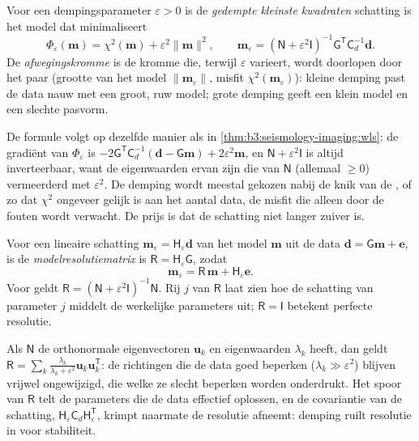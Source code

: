 \begin{definition}\label{def:b3:seismology-imaging:damped}
Voor een dempingsparameter $\varepsilon > 0$ is de \emph{gedempte kleinste
kwadraten} schatting is het model dat minimaliseert
\[
  \Phi_\varepsilon(\mathbf m) = \chi^2(\mathbf m) + \varepsilon^2\|\mathbf m\|^2 ,
  \qquad
  \mathbf m_\varepsilon = \left(\mathsf N + \varepsilon^2\mathsf I\right)^{-1}
  \mathsf G^{\mathsf T}\mathsf C_d^{-1}\mathbf d .
\]
De \emph{afwegingskromme} is de kromme die, terwijl
$\varepsilon$ varieert, wordt doorlopen door het paar (grootte van het model $\|\mathbf m_\varepsilon\|$,
misfit $\chi^2(\mathbf m_\varepsilon)$): kleine demping past de data nauw
met een groot, ruw model; grote demping geeft een klein model en een slechte pasvorm.
\end{definition}

De formule volgt op dezelfde manier als in \cref{thm:b3:seismology-imaging:wls}: de gradiënt
van $\Phi_\varepsilon$ is $-2\mathsf G^{\mathsf T}\mathsf C_d^{-1}(\mathbf d -
\mathsf G\mathbf m) + 2\varepsilon^2\mathbf m$, en $\mathsf N + \varepsilon^2
\mathsf I$ is altijd inverteerbaar, want de eigenwaarden ervan zijn die van
$\mathsf N$ (allemaal $\ge 0$) vermeerderd met $\varepsilon^2$. De demping wordt meestal
gekozen nabij de knik van de , of zo dat $\chi^2$ ongeveer gelijk is aan
het aantal data, de misfit die alleen door de fouten wordt verwacht. De prijs is dat de
schatting niet langer zuiver is.

\begin{definition}[Modelresolutiematrix]\label{def:b3:seismology-imaging:resolution}
Voor een lineaire schatting $\mathbf m_\varepsilon = \mathsf H_\varepsilon \mathbf d$
van het model $\mathbf m$ uit de data $\mathbf d = \mathsf G\mathbf m + \mathbf e$,
is de \emph{modelresolutiematrix} is
$\mathsf R = \mathsf H_\varepsilon\mathsf G$, zodat
\[
  \mathbf m_\varepsilon = \mathsf R\,\mathbf m + \mathsf H_\varepsilon\mathbf e .
\]
Voor  geldt $\mathsf R = (\mathsf N + \varepsilon^2\mathsf I)^{-1}
\mathsf N$. Rij $j$ van $\mathsf R$ laat zien hoe de schatting van parameter $j$
middelt de werkelijke parameters uit; $\mathsf R = \mathsf I$ betekent perfecte resolutie.
\end{definition}

Als $\mathsf N$ de orthonormale eigenvectoren $\mathbf u_k$ en eigenwaarden
$\lambda_k$ heeft, dan geldt $\mathsf R = \sum_k \frac{\lambda_k}{\lambda_k + \varepsilon^2}
\mathbf u_k\mathbf u_k^{\mathsf T}$: de richtingen die de data goed beperken
($\lambda_k \gg \varepsilon^2$) blijven vrijwel ongewijzigd, die welke ze
slecht beperken worden onderdrukt. Het spoor van $\mathsf R$ telt de parameters die de data
effectief oplossen, en de covariantie van de schatting,
$\mathsf H_\varepsilon\mathsf C_d\mathsf H_\varepsilon^{\mathsf T}$, krimpt naarmate
de resolutie afneemt: demping ruilt resolutie in voor stabiliteit.

